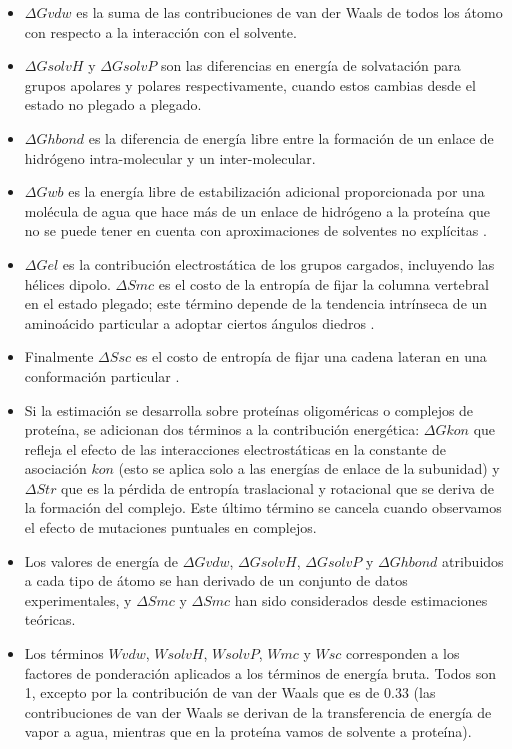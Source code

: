 \begin{itemize}
	
	\item $\Delta Gvdw$ es la suma de las contribuciones de van der Waals de todos los átomo con respecto a la interacción con el solvente.
	
	\item $\Delta GsolvH$ y $\Delta GsolvP$ son las diferencias en energía de solvatación para grupos apolares y polares respectivamente, cuando estos cambias desde el estado no plegado a plegado.
	
	\item $\Delta Ghbond$ es la diferencia de energía libre entre la formación de un enlace de hidrógeno intra-molecular y un inter-molecular.
	
	\item $\Delta Gwb$ es la energía libre de estabilización adicional proporcionada por una molécula de agua que hace más de un enlace de hidrógeno a la proteína que no se puede tener en cuenta con aproximaciones de solventes no explícitas \cite{petukhov1999local}. 
	
	\item $\Delta Gel$ es la contribución electrostática de los grupos cargados, incluyendo las hélices dipolo. $\Delta Smc$ es el costo de la entropía de fijar la columna vertebral en el estado plegado; este término depende de la tendencia intrínseca de un aminoácido particular a adoptar ciertos ángulos diedros \cite{munoz1996local, munoz1995hydrophobic}. 
	
	\item Finalmente $\Delta Ssc$ es el costo de entropía de fijar una cadena lateran en una conformación particular \cite{abagyan1994biased}. 
	
	\item Si la estimación se desarrolla sobre proteínas oligoméricas o complejos de proteína, se adicionan dos términos a la contribución energética: $\Delta Gkon$ que refleja el efecto de las interacciones electrostáticas en la constante de asociación $kon$ (esto se aplica solo a las energías de enlace de la subunidad) \cite{vijayakumar1998electrostatic} y $\Delta Str$ que es la pérdida de entropía traslacional y rotacional que se deriva de la formación del complejo. Este último término se cancela cuando observamos el efecto de mutaciones puntuales en complejos. 
	
	\item Los valores de energía de $\Delta Gvdw$, $\Delta GsolvH$, $\Delta GsolvP$ y $\Delta Ghbond$ atribuidos a cada tipo de átomo se han derivado de un conjunto de datos experimentales, y $\Delta Smc$ y $\Delta Smc$ han sido considerados desde estimaciones teóricas. 
	
	\item Los términos $Wvdw$, $WsolvH$, $WsolvP$, $Wmc$ y $Wsc$ corresponden a los factores de ponderación aplicados a los términos de energía bruta. Todos son 1, excepto por la contribución de van der Waals que es de 0.33 (las contribuciones de van der Waals se derivan de la transferencia de energía de vapor a agua, mientras que en la proteína vamos de solvente a proteína).
	
\end{itemize}

